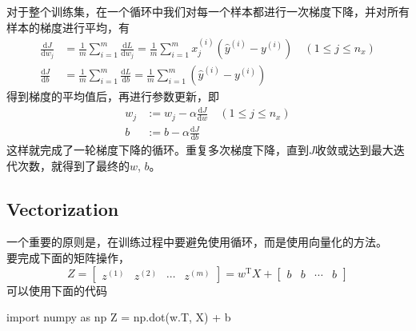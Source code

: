 \vspace{0.5\baselineskip}
对于整个训练集，在一个循环中我们对每一个样本都进行一次梯度下降，并对所有样本的梯度进行平均，有
\begin{equation}
	\begin{aligned}
		\frac{\mathrm{d}J}{\mathrm{d}w_j} &= \frac{1}{m} \sum_{i=1}^{m} \frac{\mathrm{d}L}{\mathrm{d}w_j} = \frac{1}{m} \sum_{i=1}^{m} x_j^{(i)} (\hat{y}^{(i)} - y^{(i)}) \quad (1 \leqslant j \leqslant n_x)\\
		\frac{\mathrm{d}J}{\mathrm{d}b} &= \frac{1}{m} \sum_{i=1}^{m} \frac{\mathrm{d}L}{\mathrm{d}b} = \frac{1}{m} \sum_{i=1}^{m} (\hat{y}^{(i)} - y^{(i)})
	\end{aligned}
\end{equation}
得到梯度的平均值后，再进行参数更新，即
\begin{equation}
	\begin{aligned}
	w_j &:= w_j - \alpha \frac{\mathrm{d}J}{\mathrm{d}w} \quad (1 \leqslant j \leqslant n_x) \\
	b &:= b - \alpha \frac{\mathrm{d}J}{\mathrm{d}b}
	\end{aligned} 
\end{equation}
这样就完成了一轮梯度下降的循环。重复多次梯度下降，直到$J$收敛或达到最大迭代次数，就得到了最终的$w$, $b$。

\subsection{Vectorization}

一个重要的原则是，在训练过程中要避免使用循环，而是使用向量化的方法。\\
要完成下面的矩阵操作，
\begin{equation}
	Z =
	\begin{bmatrix}
		z^{(1)} & z^{(2)} & \cdots & z^{(m)}
	\end{bmatrix}
	= w^\mathrm{T} X + 
	\begin{bmatrix}
		b & b & \cdots & b
	\end{bmatrix}
\end{equation}
可以使用下面的代码
\begin{python}
import numpy as np
Z = np.dot(w.T, X) + b
\end{python}